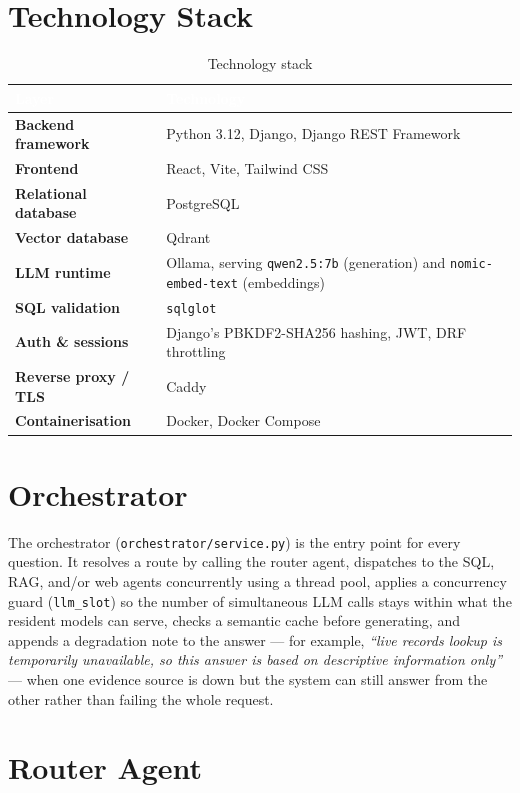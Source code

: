 \documentclass[11pt,a4paper,oneside]{report}
\begin{document}
\section{Technology Stack}

\begin{table}[h]
\centering
\caption{Technology stack}
\renewcommand{\arraystretch}{1.3}
\begin{tabularx}{\linewidth}{|>{\bfseries}p{3.2cm}|X|}
\hline
\rowcolor{hdrnavy}
\textcolor{white}{Layer} & \textcolor{white}{Technology} \\
\hline
Backend framework & Python 3.12, Django, Django REST Framework \\
\hline
Frontend & React, Vite, Tailwind CSS \\
\hline
Relational database & PostgreSQL \\
\hline
Vector database & Qdrant \\
\hline
LLM runtime & Ollama, serving \texttt{qwen2.5:7b} (generation) and
  \texttt{nomic-embed-text} (embeddings) \\
\hline
SQL validation & \texttt{sqlglot} \\
\hline
Auth \& sessions & Django's PBKDF2-SHA256 hashing, JWT, DRF throttling \\
\hline
Reverse proxy / TLS & Caddy \\
\hline
Containerisation & Docker, Docker Compose \\
\hline
\end{tabularx}
\end{table}

\section{Orchestrator}

The orchestrator (\texttt{orchestrator/service.py}) is the entry point for
every question. It resolves a route by calling the router agent, dispatches
to the SQL, RAG, and/or web agents concurrently using a thread pool, applies a
concurrency guard (\texttt{llm\_slot}) so the number of simultaneous LLM
calls stays within what the resident models can serve, checks a semantic
cache before generating, and appends a degradation note to the answer --- for
example, \emph{``live records lookup is temporarily unavailable, so this
answer is based on descriptive information only''} --- when one evidence
source is down but the system can still answer from the other rather than
failing the whole request.

\section{Router Agent}
\end{document}
